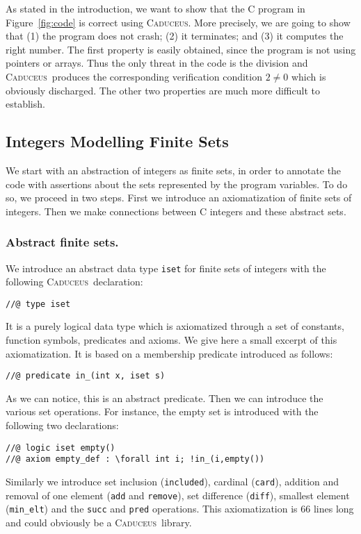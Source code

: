 \documentclass[a4paper]{llncs}
\newcommand{\caduceus}{\textsc{Caduceus}}
\begin{document}
As stated in the introduction, we want to show that the C program in
Figure~\ref{fig:code} is correct using \caduceus. More precisely, we
are going to show that (1) the program does not crash; (2)
it terminates; and (3) it computes the right number.
The first property is easily obtained, since the program is not using
pointers or arrays. Thus the only threat in the code is the division and
\caduceus\ produces the corresponding verification condition $2\not=0$
which is obviously discharged. The other two properties are much more
difficult to establish.

\subsection{Integers Modelling Finite Sets}

We start with an abstraction of integers as finite sets, in order to
annotate the code with assertions about the sets represented by the
program variables. To do so, we proceed in two steps. First we
introduce an axiomatization of finite sets of integers. Then we make
connections between C integers and these abstract sets.

\subsubsection{Abstract finite sets.}
We introduce an abstract data type \texttt{iset} for finite sets of
integers with the following \caduceus\ declaration:
\begin{verbatim}
//@ type iset
\end{verbatim}
It is a purely logical data type which is axiomatized through a set of
constants, function symbols, predicates and axioms. We give here a small 
excerpt of this axiomatization. It is based on a
membership predicate  introduced as follows:
\begin{verbatim}
//@ predicate in_(int x, iset s)
\end{verbatim}
As we can notice, this is an abstract predicate. Then we can introduce
the various set operations. For instance, the empty set is introduced
with the following two declarations:
\begin{verbatim}
//@ logic iset empty()
//@ axiom empty_def : \forall int i; !in_(i,empty())
\end{verbatim}
Similarly we introduce set inclusion (\texttt{included}), cardinal
(\texttt{card}), addition and removal
of one element (\texttt{add} and 
\texttt{remove}), set difference (\texttt{diff}), smallest element
(\texttt{min\_elt}) and the \texttt{succ} and \texttt{pred} operations.
This axiomatization is 66 lines long and could obviously be a 
\caduceus\ library.
\end{document}
